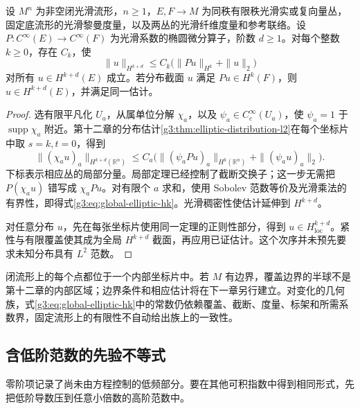 \begin{theorem}\label{g3:thm:global-elliptic-hk}
	设 \(M^n\) 为非空闭光滑流形，\(n\ge1\)，\(E,F\to M\) 为同秩有限秩光滑实或复向量丛，固定底流形的光滑黎曼度量，以及两丛的光滑纤维度量和参考联络。设 \(P:C^\infty(E)\to C^\infty(F)\) 为光滑系数的椭圆微分算子，阶数 \(d\ge1\)。对每个整数 \(k\ge0\)，存在 \(C_k\)，使
	\begin{equation}\label{g3:eq:global-elliptic-hk}
		\|u\|_{H^{k+d}}\le C_k\bigl(\|Pu\|_{H^k}+\|u\|_2\bigr)
	\end{equation}
	对所有 \(u\in H^{k+d}(E)\) 成立。若分布截面 \(u\) 满足 \(Pu\in H^k(F)\)，则 \(u\in H^{k+d}(E)\)，并满足同一估计。
\end{theorem}
\begin{proof}
	选有限平凡化 \(U_a\)，从属单位分解 \(\chi_a\)，以及 \(\psi_a\in C_c^\infty(U_a)\)，使 \(\psi_a=1\) 于 \(\operatorname{supp}\chi_a\) 附近。第十二章的分布估计\cref{g3:thm:elliptic-distribution-l2}在每个坐标片中取 \(s=k,t=0\)，得到
	\[
		\|(\chi_a u)_a\|_{H^{k+d}(\mathbb R^n)}
		\le C_a\bigl(\|(\psi_a Pu)_a\|_{H^k(\mathbb R^n)}+\|(\psi_a u)_a\|_2\bigr).
	\]
	下标表示相应丛的局部分量。局部定理已经控制了截断交换子；这一步无需把 \(P(\chi_a u)\) 错写成 \(\chi_a Pu\)。对有限个 \(a\) 求和，使用 Sobolev 范数等价及光滑乘法的有界性，即得式\eqref{g3:eq:global-elliptic-hk}。光滑稠密性使估计延伸到 \(H^{k+d}\)。

	对任意分布 \(u\)，先在每张坐标片使用同一定理的正则性部分，得到 \(u\in H^{k+d}_{\mathrm{loc}}\)。紧性与有限覆盖使其成为全局 \(H^{k+d}\) 截面，再应用已证估计。这个次序并未预先要求未知分布具有 \(L^2\) 范数。
\end{proof}

闭流形上的每个点都位于一个内部坐标片中。若 \(M\) 有边界，覆盖边界的半球不是第十二章的内部区域；边界条件和相应估计将在下一章另行建立。对变化的几何族，式\eqref{g3:eq:global-elliptic-hk}中的常数仍依赖覆盖、截断、度量、标架和所需系数界，固定流形上的有限性不自动给出族上的一致性。

\subsection{含低阶范数的先验不等式}
\label{g3:subsec:1301:02}
零阶项记录了尚未由方程控制的低频部分。要在其他可积指数中得到相同形式，先把低阶导数压到任意小倍数的高阶范数中。

